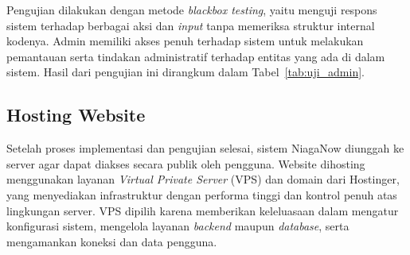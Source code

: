 \documentclass[12pt,a4paper,twocolumn]{article}
\begin{document}
Pengujian dilakukan dengan metode \textit{blackbox testing}, yaitu menguji respons sistem terhadap berbagai aksi dan \textit{input} tanpa memeriksa struktur internal kodenya. Admin memiliki akses penuh terhadap sistem untuk melakukan pemantauan serta tindakan administratif terhadap entitas yang ada di dalam sistem. Hasil dari pengujian ini dirangkum dalam Tabel~\ref{tab:uji_admin}.

\begin{table}[!ht]
\centering
\caption{Hasil Uji Coba \textit{Blackbox} sebagai Admin}
\label{tab:uji_admin}
\end{table}

\subsection{Hosting Website}

Setelah proses implementasi dan pengujian selesai, sistem NiagaNow diunggah ke server agar dapat diakses secara publik oleh pengguna. Website dihosting menggunakan layanan \textit{Virtual Private Server} (VPS) dan domain dari Hostinger, yang menyediakan infrastruktur dengan performa tinggi dan kontrol penuh atas lingkungan server. VPS dipilih karena memberikan keleluasaan dalam mengatur konfigurasi sistem, mengelola layanan \textit{backend} maupun \textit{database}, serta mengamankan koneksi dan data pengguna.
\end{document}
